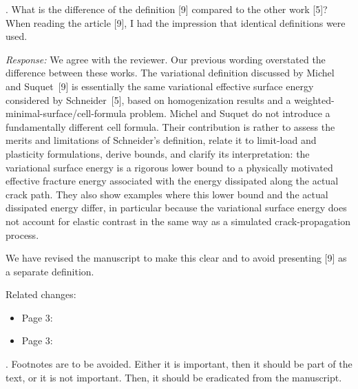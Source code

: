 \documentclass[pdflatex,sn-mathphys-num]{sn-jnl}
\begin{document}
\bigskip

. What is the difference of the definition [9] compared to the other work [5]? When reading the article [9], I had the impression that identical definitions were used.

\emph{Response:} We agree with the reviewer. Our previous wording overstated the difference between these works. The variational definition discussed by Michel and Suquet~[9] is essentially the same variational effective surface energy considered by Schneider~[5], based on homogenization results and a weighted-minimal-surface/cell-formula problem. Michel and Suquet do not introduce a fundamentally different cell formula. Their contribution is rather to assess the merits and limitations of Schneider's definition, relate it to limit-load and plasticity formulations, derive bounds, and clarify its interpretation: the variational surface energy is a rigorous lower bound to a physically motivated effective fracture energy associated with the energy dissipated along the actual crack path. They also show examples where this lower bound and the actual dissipated energy differ, in particular because the variational surface energy does not account for elastic contrast in the same way as a simulated crack-propagation process.

We have revised the manuscript to make this clear and to avoid presenting [9] as a separate definition.

Related changes:
\begin{itemize}
\item Page 3:  
\item Page 3: 
\end{itemize}

\bigskip

. Footnotes are to be avoided. Either it is important, then it should be part of the text, or it is not important. Then, it should be eradicated from the manuscript.
\end{document}
